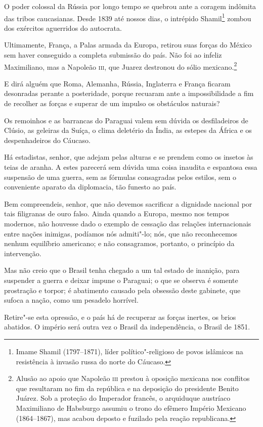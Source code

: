 \begin{linenumbers}
 O poder colossal da Rússia por longo tempo se quebrou ante a coragem
indômita das tribos caucasianas. Desde 1839 até nossos dias, o
intrépido Shamil\footnote{ Imame Shamil (1797--1871), líder político"-religioso de povos
islâmicos na resistência à invasão russa do norte do Cáucaso.}
 zombou dos exércitos aguerridos do autocrata. 

 Ultimamente, França, a Palas armada da Europa, retirou suas forças do
México sem haver conseguido a completa submissão do país. Não foi ao
infeliz Maximiliano, mas a Napoleão \textsc{iii}, que Juarez destronou do sólio
mexicano.\footnote{ Alusão ao apoio que Napoleão \textsc{iii} prestou à oposição mexicana nos conflitos que
resultaram no fim da república e na deposição do presidente Benito
Juárez. Sob a proteção do Imperador francês, o arquiduque austríaco
Maximiliano de Habsburgo assumiu o trono do efêmero Império Mexicano
(1864--1867), mas acabou deposto e fuzilado pela reação republicana.}


 E dirá alguém que Roma, Alemanha, Rússia, Inglaterra e França ficaram
desonradas perante a posteridade, porque recuaram ante a
impossibilidade a fim de recolher as forças e superar de um impulso os
obstáculos naturais?

 Os remoinhos e as barrancas do Paraguai valem sem dúvida os
desfiladeiros de Clúsio, as geleiras da Suíça, o clima deletério da
Índia, as estepes da África e os despenhadeiros do Cáucaso. 

 Há estadistas, senhor, que adejam pelas alturas e se prendem como os
insetos às teias de aranha. A estes parecerá sem dúvida uma coisa
inaudita e espantosa essa suspensão de uma guerra, sem as fórmulas
consagradas pelos estilos, sem o conveniente aparato da diplomacia, tão
funesto ao país. 

 Bem compreendeis, senhor, que não devemos sacrificar a dignidade
nacional por tais filigranas de ouro falso. Ainda quando a Europa,
mesmo nos tempos modernos, não houvesse dado o exemplo de cessação das
relações internacionais entre nações inimigas, podíamos nós
admiti"-lo; nós, que não reconhecemos nenhum equilíbrio americano; e
não consagramos, portanto, o princípio da intervenção. 

 Mas não creio que o Brasil tenha chegado a um tal estado de inanição,
para suspender a guerra e deixar impune o Paraguai; o que se observa é
somente prostração e torpor; é abatimento causado pela obsessão deste
gabinete, que sufoca a nação, como um pesadelo horrível.

 Retire"-se esta opressão, e o país há de recuperar as forças inertes,
os brios abatidos. O império será outra vez o Brasil da independência,
o Brasil de 1851. 


\end{linenumbers}
